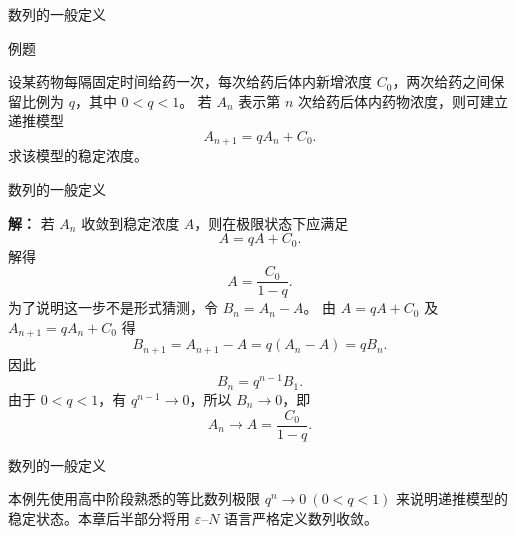 \documentclass[aspectratio=169,10pt,fontset=fandol]{ctexbeamer}
\begin{document}
\begin{frame}[t,fragile]{数列的一般定义}
\normalsize
\begin{block}{例题}
{\normalsize
设某药物每隔固定时间给药一次，每次给药后体内新增浓度 $C_0$，两次给药之间保留比例为 $q$，其中 $0<q<1$。 若 $A_n$ 表示第 $n$ 次给药后体内药物浓度，则可建立递推模型
\[
A_{n+1}=qA_n+C_0.
\]
求该模型的稳定浓度。

}
\end{block}
\end{frame}
\begin{frame}[t,fragile]{数列的一般定义}
\footnotesize
{\footnotesize
\textbf{解：}
若 $A_n$ 收敛到稳定浓度 $A$，则在极限状态下应满足
\[
A=qA+C_0.
\]
解得
\[
A=\frac{C_0}{1-q}.
\]
为了说明这一步不是形式猜测，令 $B_n=A_n-A$。 由 $A=qA+C_0$ 及 $A_{n+1}=qA_n+C_0$ 得
\[
B_{n+1}=A_{n+1}-A=q(A_n-A)=qB_n.
\]
因此
\[
B_n=q^{n-1}B_1.
\]
由于 $0<q<1$，有 $q^{n-1}\to0$，所以 $B_n\to0$，即
\[
A_n\to A=\frac{C_0}{1-q}.
\]

}
\end{frame}
\begin{frame}[t,fragile]{数列的一般定义}
\normalsize
{\normalsize
本例先使用高中阶段熟悉的等比数列极限 $q^n\to0\ (0<q<1)$ 来说明递推模型的稳定状态。本章后半部分将用 $\varepsilon$--$N$ 语言严格定义数列收敛。

}
\end{frame}
\end{document}
